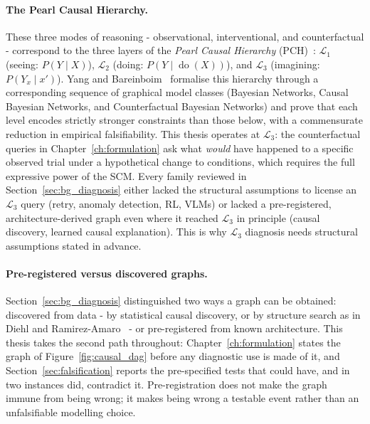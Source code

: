 \documentclass[11pt,a4paper]{report}
\newcommand{\doop}{\operatorname{do}}
\begin{document}
\paragraph{The Pearl Causal Hierarchy.}
These three modes of reasoning - observational, interventional, and counterfactual - correspond to the three layers of the \emph{Pearl Causal Hierarchy} (PCH)~\cite{pearl2009causality}: $\mathcal{L}_1$ (seeing: $P(Y \mid X)$), $\mathcal{L}_2$ (doing: $P(Y \mid \doop(X))$), and $\mathcal{L}_3$ (imagining: $P(Y_x \mid x')$). Yang and Bareinboim~\cite{yang2025hierarchy} formalise this hierarchy through a corresponding sequence of graphical model classes (Bayesian Networks, Causal Bayesian Networks, and Counterfactual Bayesian Networks) and prove that each level encodes strictly stronger constraints than those below, with a commensurate reduction in empirical falsifiability. This thesis operates at $\mathcal{L}_3$: the counterfactual queries in Chapter~\ref{ch:formulation} ask what \emph{would} have happened to a specific observed trial under a hypothetical change to conditions, which requires the full expressive power of the SCM. Every family reviewed in Section~\ref{sec:bg_diagnosis} either lacked the structural assumptions to license an $\mathcal{L}_3$ query (retry, anomaly detection, RL, VLMs) or lacked a pre-registered, architecture-derived graph even where it reached $\mathcal{L}_3$ in principle (causal discovery, learned causal explanation). This is why $\mathcal{L}_3$ diagnosis needs structural assumptions stated in advance.

\paragraph{Pre-registered versus discovered graphs.} Section~\ref{sec:bg_diagnosis} distinguished two ways a graph can be obtained: discovered from data - by statistical causal discovery, or by structure search as in Diehl and Ramirez-Amaro~\cite{diehl2022whydidifail} - or pre-registered from known architecture. This thesis takes the second path throughout: Chapter~\ref{ch:formulation} states the graph of Figure~\ref{fig:causal_dag} before any diagnostic use is made of it, and Section~\ref{sec:falsification} reports the pre-specified tests that could have, and in two instances did, contradict it. Pre-registration does not make the graph immune from being wrong; it makes being wrong a testable event rather than an unfalsifiable modelling choice.
\end{document}
